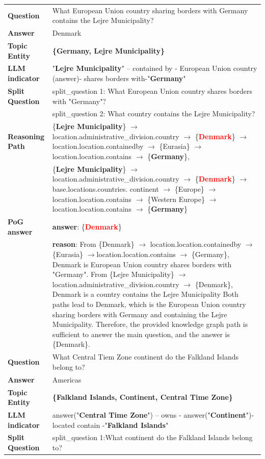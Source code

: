 \begin{table}[]
\begin{tabularx}{0.9\textwidth}{@{}p{3cm}X@{}}
\midrule
\textbf{Question} & What European Union country sharing borders with Germany contains the Lejre Municipality? \\ 
\textbf{Answer} & Denmark \\
\textbf{Topic Entity} & \textbf{\{Germany, Lejre Municipality\}} \\
\toprule
\textbf{LLM indicator} & "\textbf{Lejre Municipality}" – contained by - European Union country (answer)- shares borders with-"\textbf{Germany}" \\
\textbf{Split Question} & split\_question 1: What European Union country shares borders with "Germany"? \\
& split\_question 2: What country contains the Lejre Municipality?\\
\toprule
\textbf{Reasoning Path} &\{\textbf{Lejre Municipality}\} $\rightarrow$ location.administrative\_division.country $\rightarrow$ \{\textcolor{red}{\textbf{Denmark}}\} $\rightarrow$ location.location.containedby $\rightarrow$ \{Eurasia\} $\rightarrow$ location.location.contains $\rightarrow$ \{\textbf{Germany}\}, \\
&\{\textbf{Lejre Municipality}\} $\rightarrow$ location.administrative\_division.country $\rightarrow$ \{\textcolor{red}{\textbf{Denmark}}\} $\rightarrow$ base.locations.countries. continent $\rightarrow$ \{Europe\} $\rightarrow$ location.location.contains $\rightarrow$ \{Western Europe\} $\rightarrow$ location.location.contains $\rightarrow$ \{\textbf{Germany}\}\\
\toprule
\textbf{PoG answer} & 
\textbf{answer}: \{\textcolor{red}{\textbf{Denmark}}\} \\

 & \textbf{reason}: From \{Denmark\} $\rightarrow $ location.location.containedby $\rightarrow$ \{Eurasia\} $\rightarrow$location.location.contains $\rightarrow$ \{Germany\}, Denmark is European Union country shares borders with "Germany". From \{Lejre Municipality\} $\rightarrow$ location.administrative\_division.country $\rightarrow$ \{Denmark\}, Denmark is a country contains the Lejre Municipality Both paths lead to Denmark, which is the European Union country sharing borders with Germany and containing the Lejre Municipality. Therefore, the provided knowledge graph path is sufficient to answer the main question, and the answer is \{Denmark\}.\\

\bottomrule


\midrule
\textbf{Question} & What Central Tiem Zone continent do the Falkland Islands belong to? \\ 
\textbf{Answer} & Americas \\
\textbf{Topic Entity} & \textbf{\{Falkland Islands, Continent, Central Time Zone\}} \\
\toprule
\textbf{LLM indicator} & answer("\textbf{Central Time Zone}") – owns - answer("\textbf{Continent}")- located contain -"\textbf{Falkland Islands}" \\
\textbf{Split Question} & split\_question 1:What continent do the Falkland Islands belong to? \\


\end{tabularx}
\end{table}
